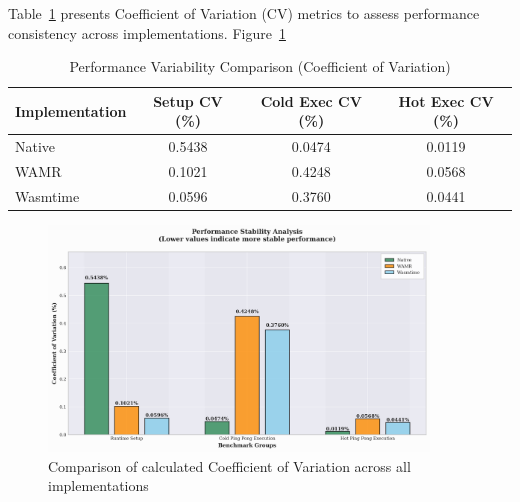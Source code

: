 Table~\ref{tab:variability} presents Coefficient of Variation (CV) metrics to assess performance consistency across implementations. Figure~\ref{fig:variability-comparison}

\begin{table}[h]
    \centering
    \caption{Performance Variability Comparison (Coefficient of Variation)}
    \label{tab:variability}
    \begin{tabular}{lccc}
    \toprule
    \textbf{Implementation} & \textbf{Setup CV (\%)} & \textbf{Cold Exec CV (\%)} & \textbf{Hot Exec CV (\%)} \\
    \midrule
    Native       & 0.5438 & 0.0474 & 0.0119 \\
    WAMR         & 0.1021 & 0.4248 & 0.0568 \\
    Wasmtime     & 0.0596 & 0.3760 & 0.0441 \\
    \bottomrule
    \end{tabular}
\end{table}

\begin{figure}[h]
    \centering
    \includegraphics[width=0.9\textwidth]{images/variability-comparison}
    \caption{Comparison of calculated Coefficient of Variation across all implementations}
    \label{fig:variability-comparison}
\end{figure}

